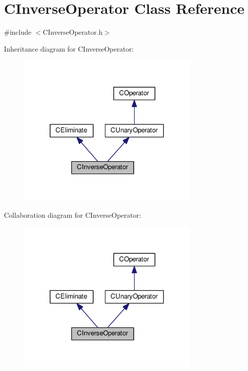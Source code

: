 \hypertarget{classCInverseOperator}{}\section{C\+Inverse\+Operator Class Reference}
\label{classCInverseOperator}


{\ttfamily \#include $<$C\+Inverse\+Operator.\+h$>$}



Inheritance diagram for C\+Inverse\+Operator\+:\nopagebreak
\begin{figure}[H]
\begin{center}
\leavevmode
\includegraphics[width=252pt]{classCInverseOperator__inherit__graph}
\end{center}
\end{figure}


Collaboration diagram for C\+Inverse\+Operator\+:\nopagebreak
\begin{figure}[H]
\begin{center}
\leavevmode
\includegraphics[width=252pt]{classCInverseOperator__coll__graph}
\end{center}
\end{figure}
